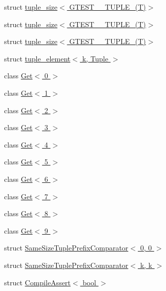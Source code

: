 \begin{DoxyCompactItemize}
struct \hyperlink{structstd_1_1tr1_1_1tuple__size_3_01GTEST__8__TUPLE___07T_08_4}{tuple\-\_\-size$<$ G\-T\-E\-S\-T\-\_\-\_\-\-T\-U\-P\-L\-E\-\_\-(\-T)$>$}
\item 
struct \hyperlink{structstd_1_1tr1_1_1tuple__size_3_01GTEST__9__TUPLE___07T_08_4}{tuple\-\_\-size$<$ G\-T\-E\-S\-T\-\_\-\_\-\-T\-U\-P\-L\-E\-\_\-(\-T)$>$}
\item 
struct \hyperlink{structstd_1_1tr1_1_1tuple__size_3_01GTEST__10__TUPLE___07T_08_4}{tuple\-\_\-size$<$ G\-T\-E\-S\-T\-\_\-\_\-\-T\-U\-P\-L\-E\-\_\-(\-T)$>$}
\item 
struct \hyperlink{structstd_1_1tr1_1_1tuple__element}{tuple\-\_\-element$<$ k, Tuple $>$}
\item 
class \hyperlink{classstd_1_1tr1_1_1gtest__internal_1_1Get_3_010_01_4}{\-Get$<$ 0 $>$}
\item 
class \hyperlink{classstd_1_1tr1_1_1gtest__internal_1_1Get_3_011_01_4}{\-Get$<$ 1 $>$}
\item 
class \hyperlink{classstd_1_1tr1_1_1gtest__internal_1_1Get_3_012_01_4}{\-Get$<$ 2 $>$}
\item 
class \hyperlink{classstd_1_1tr1_1_1gtest__internal_1_1Get_3_013_01_4}{\-Get$<$ 3 $>$}
\item 
class \hyperlink{classstd_1_1tr1_1_1gtest__internal_1_1Get_3_014_01_4}{\-Get$<$ 4 $>$}
\item 
class \hyperlink{classstd_1_1tr1_1_1gtest__internal_1_1Get_3_015_01_4}{\-Get$<$ 5 $>$}
\item 
class \hyperlink{classstd_1_1tr1_1_1gtest__internal_1_1Get_3_016_01_4}{\-Get$<$ 6 $>$}
\item 
class \hyperlink{classstd_1_1tr1_1_1gtest__internal_1_1Get_3_017_01_4}{\-Get$<$ 7 $>$}
\item 
class \hyperlink{classstd_1_1tr1_1_1gtest__internal_1_1Get_3_018_01_4}{\-Get$<$ 8 $>$}
\item 
class \hyperlink{classstd_1_1tr1_1_1gtest__internal_1_1Get_3_019_01_4}{\-Get$<$ 9 $>$}
\item 
struct \hyperlink{structstd_1_1tr1_1_1gtest__internal_1_1SameSizeTuplePrefixComparator_3_010_00_010_01_4}{\-Same\-Size\-Tuple\-Prefix\-Comparator$<$ 0, 0 $>$}
\item 
struct \hyperlink{structstd_1_1tr1_1_1gtest__internal_1_1SameSizeTuplePrefixComparator_3_01k_00_01k_01_4}{\-Same\-Size\-Tuple\-Prefix\-Comparator$<$ k, k $>$}
\item 
struct \hyperlink{structtesting_1_1internal_1_1CompileAssert}{\-Compile\-Assert$<$ bool $>$}
\item 

\end{DoxyCompactItemize}
